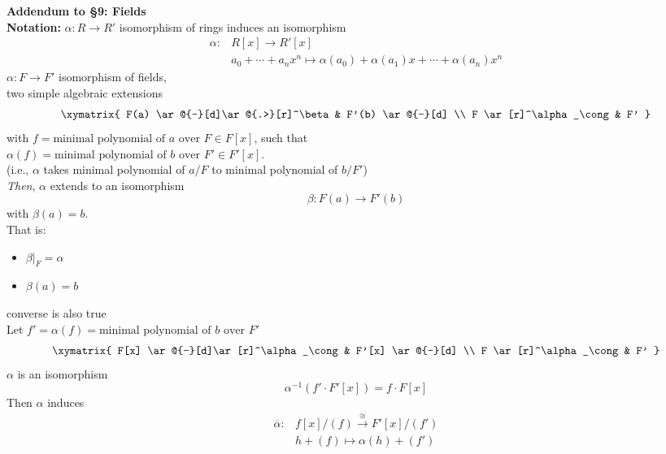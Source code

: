 \textbf{Addendum to \S9: Fields} \\
\textbf{Notation: }$\alpha\colon R\to R'$ isomorphism of rings induces an isomorphism
\begin{align*}
\alpha\colon &R[x] \to R'[x] \\
&a_0+\dotsb+a_nx^n\mapsto\alpha(a_0)+\alpha(a_1)x+\dotsb+\alpha(a_n)x^n
\end{align*}
\lem $\alpha\colon F\to F'$ isomorphism of fields, \\
two simple algebraic extensions
\[ \xymatrix{
F(a) \ar@{-}[d]\ar@{.>}[r]^\beta & F'(b) \ar@{-}[d] \\ %
F \ar[r]^\alpha_\cong & F'
} \]
with $f=\text{minimal polynomial of $a$ over $F$}\in F[x]$, such that \\ $\alpha(f)=\text{minimal polynomial of $b$ over $F'$}\in F'[x]$. \\
(i.e., $\alpha$ takes minimal polynomial of $a/F$ to minimal polynomial of $b/F'$) \\
\emph{Then}, $\alpha$ extends to an isomorphism
\[ \beta\colon F(a) \to F'(b) \]
with $\beta(a)=b$. \\
That is:
\begin{itemize}
\item $\beta|_F = \alpha$
\item $\beta(a) = b$
\end{itemize}
\ex converse is also true \\
\pf Let $f'=\alpha(f)=\text{minimal polynomial of $b$ over $F'$}$
\[ \xymatrix{
F[x] \ar@{-}[d]\ar[r]^\alpha_\cong & F'[x] \ar@{-}[d] \\
F \ar[r]^\alpha_\cong & F'
} \]
$\alpha$ is an isomorphism
\[ \alpha^{-1}(f'\cdot F'[x]) = f\cdot F[x] \]
Then $\alpha$ induces
\begin{align*}
\overline\alpha\colon &f[x]/(f) \overset{\cong}{\to} F'[x]/(f') \\
&h+(f) \mapsto \alpha(h)+(f')
\end{align*}
